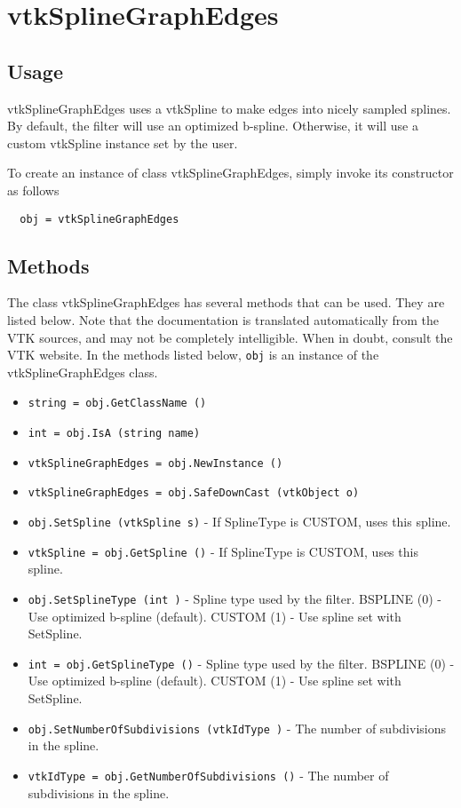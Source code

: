 \section{vtkSplineGraphEdges}

\subsection{Usage}

 vtkSplineGraphEdges uses a vtkSpline to make edges into nicely sampled
 splines. By default, the filter will use an optimized b-spline.
 Otherwise, it will use a custom vtkSpline instance set by the user.

To create an instance of class vtkSplineGraphEdges, simply
invoke its constructor as follows
\begin{verbatim}
  obj = vtkSplineGraphEdges
\end{verbatim}
\subsection{Methods}

The class vtkSplineGraphEdges has several methods that can be used.
  They are listed below.
Note that the documentation is translated automatically from the VTK sources,
and may not be completely intelligible.  When in doubt, consult the VTK website.
In the methods listed below, \verb|obj| is an instance of the vtkSplineGraphEdges class.
\begin{itemize}
\item  \verb|string = obj.GetClassName ()|

\item  \verb|int = obj.IsA (string name)|

\item  \verb|vtkSplineGraphEdges = obj.NewInstance ()|

\item  \verb|vtkSplineGraphEdges = obj.SafeDownCast (vtkObject o)|

\item  \verb|obj.SetSpline (vtkSpline s)| -  If SplineType is CUSTOM, uses this spline.

\item  \verb|vtkSpline = obj.GetSpline ()| -  If SplineType is CUSTOM, uses this spline.

\item  \verb|obj.SetSplineType (int )| -  Spline type used by the filter.
 BSPLINE (0) - Use optimized b-spline (default).
 CUSTOM (1) - Use spline set with SetSpline.

\item  \verb|int = obj.GetSplineType ()| -  Spline type used by the filter.
 BSPLINE (0) - Use optimized b-spline (default).
 CUSTOM (1) - Use spline set with SetSpline.

\item  \verb|obj.SetNumberOfSubdivisions (vtkIdType )| -  The number of subdivisions in the spline.

\item  \verb|vtkIdType = obj.GetNumberOfSubdivisions ()| -  The number of subdivisions in the spline.

\end{itemize}
